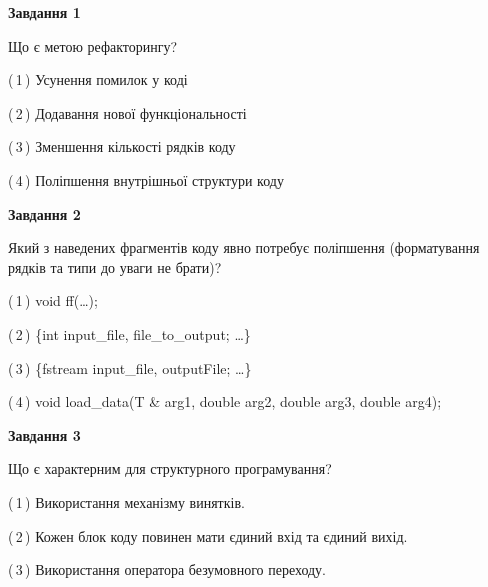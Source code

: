 \documentclass[10pt, ukrainian]{article}
\begin{document}
{
\begin {large}
{\begin {center}\textbf{Завдання 1}\end {center}}\par
Що є метою рефакторингу?\par
\vspace{2mm}



(\,1\,) Усунення помилок у коді%



(\,2\,) Додавання нової функціональності%



(\,3\,) Зменшення кількості рядків коду%



(\,4\,) Поліпшення внутрішньої структури коду%


{\begin {center}\textbf{Завдання 2}\end {center}}\par
Який з наведених фрагментів коду явно потребує поліпшення (форматування рядків та типи до уваги не брати)?\par
\vspace{2mm}



(\,1\,) void ff(…);%



(\,2\,) \{int input\_file, file\_to\_output; …\}%



(\,3\,) \{fstream input\_file, outputFile; …\}%



(\,4\,) void load\_data(T \& arg1, double arg2, double arg3, double arg4); %


{\begin {center}\textbf{Завдання 3}\end {center}}\par
Що є характерним для структурного програмування?\par
\vspace{2mm}



(\,1\,) Використання механізму винятків. %



(\,2\,) Кожен блок коду повинен мати єдиний вхід та єдиний вихід.%



(\,3\,) Використання оператора безумовного переходу. %




\end{large}}
\end{document}
